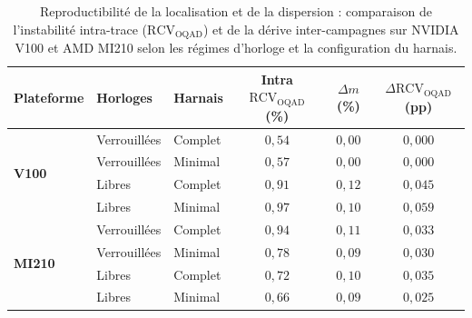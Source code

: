 \begin{table}[htb]
    \centering
    \small
    \caption{Reproductibilité de la localisation et de la dispersion : comparaison de l'instabilité intra-trace ($\mathrm{RCV}_{\mathrm{OQAD}}$) et de la dérive inter-campagnes sur NVIDIA V100 et AMD MI210 selon les régimes d'horloge et la configuration du harnais.}
    \label{tab:rq2_location_dispersion}
    \renewcommand{\arraystretch}{1.25}
    \begin{tabular}{lllccc}
        \toprule
        \textbf{Plateforme} & \textbf{Horloges} & \textbf{Harnais} & 
        \textbf{Intra $\mathrm{RCV}_{\mathrm{OQAD}}$ (\%)} & 
        \textbf{$\Delta m$ (\%)} & 
        \textbf{$\Delta \mathrm{RCV}_{\mathrm{OQAD}}$ (pp)} \\
        \midrule
        \multirow{4}{*}{\textbf{V100}} 
        & Verrouillées & Complet  & $0{,}54$ & $0{,}00$ & $0{,}000$ \\
        & Verrouillées & Minimal  & $0{,}57$ & $0{,}00$ & $0{,}000$ \\
        & Libres       & Complet  & $0{,}91$ & $0{,}12$ & $0{,}045$ \\
        & Libres       & Minimal  & $0{,}97$ & $0{,}10$ & $0{,}059$ \\
        \midrule
        \multirow{4}{*}{\textbf{MI210}} 
        & Verrouillées & Complet  & $0{,}94$ & $0{,}11$ & $0{,}033$ \\
        & Verrouillées & Minimal  & $0{,}78$ & $0{,}09$ & $0{,}030$ \\
        & Libres       & Complet  & $0{,}72$ & $0{,}10$ & $0{,}035$ \\
        & Libres       & Minimal  & $0{,}66$ & $0{,}09$ & $0{,}025$ \\
        \bottomrule
    \end{tabular}
    \vspace{0.15cm}
\end{table}
